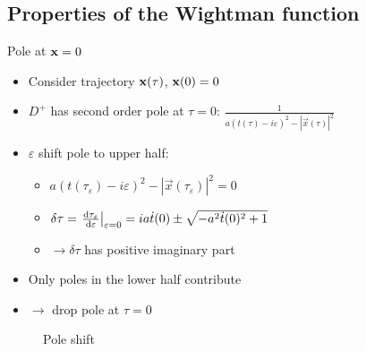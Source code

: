 \documentclass{beamer}
\renewcommand{\va}[1]{\vec{#1}}
\begin{document}
\subsection{Properties of the Wightman function}
\begin{frame}{Pole at \(\vb{x} = 0\)}
\begin{itemize}
	\item Consider trajectory \(\vb{x}(\tau)\), \(\vb{x}(0) = 0\)
	\item \(D^+\) has second order pole at \(\tau = 0\): \(\frac{1}{a(t(\tau)-i\varepsilon)^2 - |\va{x}(\tau)|^2}\)
	\item \(\varepsilon\) shift pole to upper half:
	\begin{itemize}
		\item \(a(t(\tau_\varepsilon)-i\varepsilon)^2 - |\va{x}(\tau_\varepsilon)|^2 = 0\)
		\item \(\delta\tau = \eval{\dv{\tau_\varepsilon}{\varepsilon}}_{\varepsilon = 0} = ia\dot{t}(0) \pm \sqrt{-a^2 \dot{t}(0)^2 + 1}\)
		\item[] \(\to \delta\tau\) has positive imaginary part
	\end{itemize}
	\item Only poles in the lower half contribute 
	\item[] \(\to\) drop pole at \(\tau = 0\)
\end{itemize}
\begin{figure}
\centering
{}
\caption{Pole shift}
\end{figure}
\end{frame}
\end{document}
